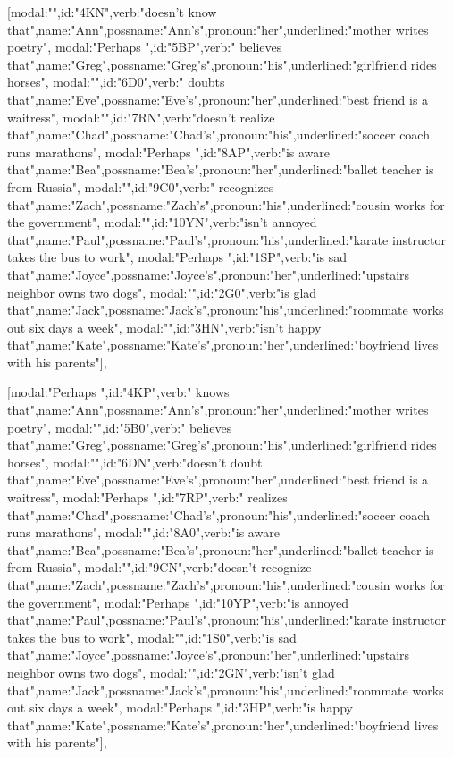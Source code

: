 [{modal:"",id:"4KN",verb:"doesn't know that",name:"Ann",possname:"Ann's",pronoun:"her",underlined:"mother writes poetry"},
{modal:"Perhaps ",id:"5BP",verb:" believes that",name:"Greg",possname:"Greg's",pronoun:"his",underlined:"girlfriend rides horses"},
{modal:"",id:"6D0",verb:" doubts that",name:"Eve",possname:"Eve's",pronoun:"her",underlined:"best friend is a waitress"},
{modal:"",id:"7RN",verb:"doesn't realize that",name:"Chad",possname:"Chad's",pronoun:"his",underlined:"soccer coach runs marathons"},
{modal:"Perhaps ",id:"8AP",verb:"is aware that",name:"Bea",possname:"Bea's",pronoun:"her",underlined:"ballet teacher is from Russia"},
{modal:"",id:"9C0",verb:" recognizes that",name:"Zach",possname:"Zach's",pronoun:"his",underlined:"cousin works for the government"},
{modal:"",id:"10YN",verb:"isn't annoyed that",name:"Paul",possname:"Paul's",pronoun:"his",underlined:"karate instructor takes the bus to work"},
{modal:"Perhaps ",id:"1SP",verb:"is sad that",name:"Joyce",possname:"Joyce's",pronoun:"her",underlined:"upstairs neighbor owns two dogs"},
{modal:"",id:"2G0",verb:"is glad that",name:"Jack",possname:"Jack's",pronoun:"his",underlined:"roommate works out six days a week"},
{modal:"",id:"3HN",verb:"isn't happy that",name:"Kate",possname:"Kate's",pronoun:"her",underlined:"boyfriend lives with his parents"}],

[{modal:"Perhaps ",id:"4KP",verb:" knows that",name:"Ann",possname:"Ann's",pronoun:"her",underlined:"mother writes poetry"},
{modal:"",id:"5B0",verb:" believes that",name:"Greg",possname:"Greg's",pronoun:"his",underlined:"girlfriend rides horses"},
{modal:"",id:"6DN",verb:"doesn't doubt that",name:"Eve",possname:"Eve's",pronoun:"her",underlined:"best friend is a waitress"},
{modal:"Perhaps ",id:"7RP",verb:" realizes that",name:"Chad",possname:"Chad's",pronoun:"his",underlined:"soccer coach runs marathons"},
{modal:"",id:"8A0",verb:"is aware that",name:"Bea",possname:"Bea's",pronoun:"her",underlined:"ballet teacher is from Russia"},
{modal:"",id:"9CN",verb:"doesn't recognize that",name:"Zach",possname:"Zach's",pronoun:"his",underlined:"cousin works for the government"},
{modal:"Perhaps ",id:"10YP",verb:"is annoyed that",name:"Paul",possname:"Paul's",pronoun:"his",underlined:"karate instructor takes the bus to work"},
{modal:"",id:"1S0",verb:"is sad that",name:"Joyce",possname:"Joyce's",pronoun:"her",underlined:"upstairs neighbor owns two dogs"},
{modal:"",id:"2GN",verb:"isn't glad that",name:"Jack",possname:"Jack's",pronoun:"his",underlined:"roommate works out six days a week"},
{modal:"Perhaps ",id:"3HP",verb:"is happy that",name:"Kate",possname:"Kate's",pronoun:"her",underlined:"boyfriend lives with his parents"}],

